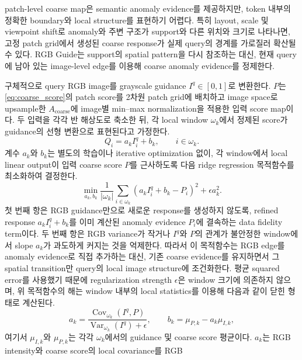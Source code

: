 patch-level coarse map은 semantic anomaly evidence를 제공하지만, token 내부의
정확한 boundary와 local structure를 표현하기 어렵다. 특히 layout, scale 및
viewpoint shift로 anomaly와 주변 구조가 support와 다른 위치와 크기로 나타나면,
고정 patch grid에서 생성된 coarse response가 실제 query의 경계를 가로질러 확산될
수 있다. RGB Guide는 support의 spatial pattern을 다시 참조하는 대신, 현재 query에
남아 있는 image-level edge를 이용해 coarse anomaly evidence를 정제한다.

구체적으로 query RGB image를 grayscale guidance $I^q\in[0,1]$로 변환한다.
$P$는 \cref{eq:coarse_score}의 patch score를 2차원 patch grid에 배치하고 image
space로 upsample한 $A_{\mathrm{coarse}}$에 image별 min--max normalization을 적용한
입력 score map이다. 두 입력을 각각 반 해상도로 축소한 뒤, 각 local window
$\omega_k$에서 정제된 score가 guidance의 선형 변환으로 표현된다고 가정한다.
\begin{equation}
  Q_i=a_k I_i^q+b_k, \qquad i\in\omega_k.
  \label{eq:guided_local_model}
\end{equation}
계수 $a_k$와 $b_k$는 별도의 학습이나 iterative optimization 없이, 각 window에서
local linear output이 입력 coarse score $P$를 근사하도록 다음 ridge regression
목적함수를 최소화하여 결정한다.
\begin{equation}
  \min_{a_k,b_k}
  \frac{1}{|\omega_k|}\sum_{i\in\omega_k}
  \left(a_k I_i^q+b_k-P_i\right)^2+\epsilon a_k^2.
  \label{eq:guided_objective}
\end{equation}
첫 번째 항은 RGB guidance만으로 새로운 response를 생성하지 않도록, refined
response $a_k I_i^q+b_k$를 이미 계산된 anomaly evidence $P_i$에 결속하는 data
fidelity term이다. 두 번째 항은 RGB variance가 작거나 $I^q$와 $P$의 관계가
불안정한 window에서 slope $a_k$가 과도하게 커지는 것을 억제한다. 따라서 이
목적함수는 RGB edge를 anomaly evidence로 직접 추가하는 대신, 기존 coarse
evidence를 유지하면서 그 spatial transition만 query의 local image structure에
조건화한다. 평균 squared error를 사용했기 때문에 regularization strength
$\epsilon$은 window 크기에 의존하지 않으며, 위 목적함수의 해는 window 내부의
local statistics를 이용해 다음과 같이 닫힌 형태로 계산된다.
\begin{equation}
  a_k=\frac{\operatorname{Cov}_{\omega_k}(I^q,P)}
             {\operatorname{Var}_{\omega_k}(I^q)+\epsilon},
  \qquad
  b_k=\mu_{P,k}-a_k\mu_{I,k},
  \label{eq:guided_coefficients}
\end{equation}
여기서 $\mu_{I,k}$와 $\mu_{P,k}$는 각각 $\omega_k$에서의 guidance 및 coarse
score 평균이다. $a_k$는 RGB intensity와 coarse score의 local covariance를 RGB
